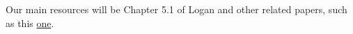 \documentclass[11pt]{article}
\begin{document}
\begin{enumerate}
    Our main resources will be Chapter 5.1 of Logan and other related papers, such as this \href{https://pdf.sciencedirectassets.com/271552/1-s2.0-S0895717700X00556/1-s2.0-S0895717797001659/main.pdf?X-Amz-Security-Token=IQoJb3JpZ2luX2VjEFMaCXVzLWVhc3QtMSJGMEQCIHGjPP3QmYF7lUpMar3X0iPw%2BLTC6Mp4J%2B5V6wRAEs3IAiBW5y4AQyZbjSqaBTOsUVC%2FMm57XAwDj0s4ZweuzxmG7irVBAjc%2F%2F%2F%2F%2F%2F%2F%2F%2F%2F8BEAUaDDA1OTAwMzU0Njg2NSIMr81u3tAkt6yfEZHdKqkEv%2BahXl5OAN%2Bblv%2FtdKKEv6JHIHgd4OCYTCgbLaT%2BpPpYKkChw84iFXE%2Fb8g1ktet8mDHeZOg60OeQn%2BL0X5Co4sBo10210NMuKzpGVvHTu3xAvXlgmGPJzOuQeAMzvKPB2wwwvN8jFm9yYEX3JmdcPMklu3lJ4GfEcgJSqb0oFMKfvLumzYSxrIKozz3xDOF8JzRvSFebaucogQrroxIg3N1M0AxZVy4MztqQA%2BLfuWIG6DzYXHJRJNWJbNUc67u9rqUXMJXwk96OeeDQzlmjjwHPtdgChW4jj1aEWn5x%2BhDEQv3aubo3rsCP682tjUeDAZDpGn0RtZ5QR46474EM4I5FYADTpHkgWFd%2F2YU4OVcUQq26WzQ4XKZMZsNat9eoXbioErq9WRFoC3rNAu2rqOEygoi9NGZUPbb80hB06Caki546NxZmJ3gov%2FDGGXUEsuNol8K04CkZcpftvJccTinD3DxB3v7wp35%2B1OQCS99exlfA%2BstooihGByg0%2F1u4Yj5hirQ0qPIBd7ePGj15wYb7RRuAhiMz%2Fx2iy3%2BUz23brTyM%2Ft6FxWO%2FjJQ4BQKdcvzMYdggNPEiyNypKRXK%2BnWzQL5o20QY2J%2Bfv9ZVVB%2BAT2%2FaFtiM3qVClr81xo2SIEjsW9xVWCxhkOswvma5Z7rYSx4DJZ6i6hwYcVoCyjeftEeMjDQ7o%2FlSlJ2Kf%2FAfFZiXPrhrLL3a1AsxM47hj%2BSaPjYoqx7ZDDZ3aSfBjqqAbfsUaPb7RmlHKItHZmDsZHDCysfih1ZAYGPieeZqyOhMwr1MnPPkbL1%2FWompvEt2QJiJnBSAo6qiyIeVF3MB%2FWhyoEHNUrYb80D5zyeBTsgrz7yHGfu7yGCeeidMV3oDAga0teMt3dJ1BR0NUrRG8r4KD%2F5zk5gi7yJs05VpFQwJTsVYLhlftP5qomVT2M4e7%2B1LVZsMNqzO8JrgBAnJsPwXc1xHw1UVH19&X-Amz-Algorithm=AWS4-HMAC-SHA256&X-Amz-Date=20230212T191601Z&X-Amz-SignedHeaders=host&X-Amz-Expires=300&X-Amz-Credential=ASIAQ3PHCVTYXJCA3JUT%2F20230212%2Fus-east-1%2Fs3%2Faws4_request&X-Amz-Signature=79be86eab77e3a5c0e64838e374d887d34b5c382c680961427e0ac4e1b8acb26&hash=8b1c8527e1ef0c5108cb085d71704f32d6f1e104d4c230540ce33e89da7f6a49&host=68042c943591013ac2b2430a89b270f6af2c76d8dfd086a07176afe7c76c2c61&pii=S0895717797001659&tid=spdf-1c2a0f02-f363-44a7-b414-315d2a5071ca&sid=5ab4ad84655bd84f5a282503effe58bea59fgxrqa&type=client&tsoh=d3d3LnNjaWVuY2VkaXJlY3QuY29t&ua=0f16505856500258515100&rr=7987a806ddd88cca&cc=us}{one}.
\end{enumerate}
\end{document}
